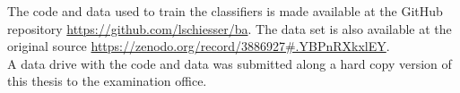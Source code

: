 The code and data used to train the classifiers is made available at the 
GitHub repository 
\href{https://github.com/lschiesser/ba}{https://github.com/lschiesser/ba}. The 
data set is also available at the original source 
\href{https://zenodo.org/record/3886927#.YBPnRXkxlEY}{ 
https://zenodo.org/record/3886927\#.YBPnRXkxlEY}.
\\
A data drive with the code and data was submitted along a 
hard copy version of this thesis to the examination office.
